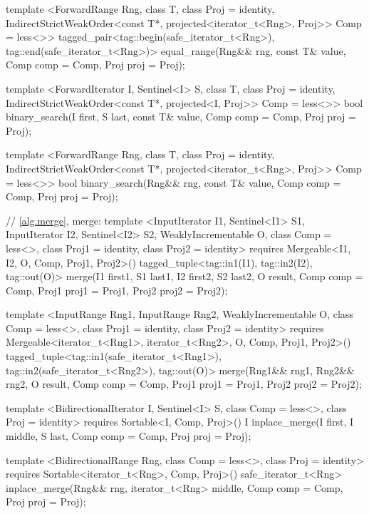 \begin{codeblock}
{{{{  template <ForwardRange Rng, class T, class Proj = identity,
      IndirectStrictWeakOrder<const T*, projected<iterator_t<Rng>, Proj>> Comp = less<>>
    tagged_pair<tag::begin(safe_iterator_t<Rng>),
                tag::end(safe_iterator_t<Rng>)>
      equal_range(Rng&& rng, const T& value, Comp comp = Comp{}, Proj proj = Proj{});

  template <ForwardIterator I, Sentinel<I> S, class T, class Proj = identity,
      IndirectStrictWeakOrder<const T*, projected<I, Proj>> Comp = less<>>
    bool
      binary_search(I first, S last, const T& value, Comp comp = Comp{},
                    Proj proj = Proj{});

  template <ForwardRange Rng, class T, class Proj = identity,
      IndirectStrictWeakOrder<const T*, projected<iterator_t<Rng>, Proj>> Comp = less<>>
    bool
      binary_search(Rng&& rng, const T& value, Comp comp = Comp{},
                    Proj proj = Proj{});

  // \ref{alg.merge}, merge:
  template <InputIterator I1, Sentinel<I1> S1, InputIterator I2, Sentinel<I2> S2,
      WeaklyIncrementable O, class Comp = less<>, class Proj1 = identity,
      class Proj2 = identity>
    requires Mergeable<I1, I2, O, Comp, Proj1, Proj2>()
    tagged_tuple<tag::in1(I1), tag::in2(I2), tag::out(O)>
      merge(I1 first1, S1 last1, I2 first2, S2 last2, O result,
            Comp comp = Comp{}, Proj1 proj1 = Proj1{}, Proj2 proj2 = Proj2{});

  template <InputRange Rng1, InputRange Rng2, WeaklyIncrementable O, class Comp = less<>,
      class Proj1 = identity, class Proj2 = identity>
    requires Mergeable<iterator_t<Rng1>, iterator_t<Rng2>, O, Comp, Proj1, Proj2>()
    tagged_tuple<tag::in1(safe_iterator_t<Rng1>),
                 tag::in2(safe_iterator_t<Rng2>),
                 tag::out(O)>
      merge(Rng1&& rng1, Rng2&& rng2, O result,
            Comp comp = Comp{}, Proj1 proj1 = Proj1{}, Proj2 proj2 = Proj2{});

  template <BidirectionalIterator I, Sentinel<I> S, class Comp = less<>,
      class Proj = identity>
    requires Sortable<I, Comp, Proj>()
    I
      inplace_merge(I first, I middle, S last, Comp comp = Comp{}, Proj proj = Proj{});

  template <BidirectionalRange Rng, class Comp = less<>, class Proj = identity>
    requires Sortable<iterator_t<Rng>, Comp, Proj>()
    safe_iterator_t<Rng>
      inplace_merge(Rng&& rng, iterator_t<Rng> middle, Comp comp = Comp{},
                    Proj proj = Proj{});

}}}}
\end{codeblock}
